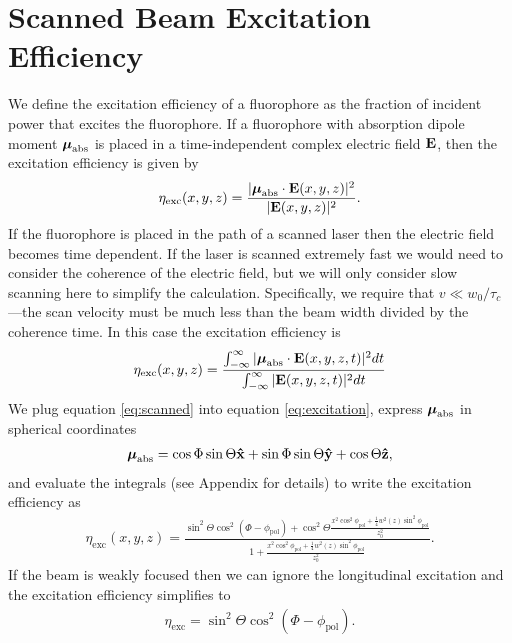 \documentclass[11pt]{article}
\begin{document}
\section{Scanned Beam Excitation Efficiency}
We define the excitation efficiency of a fluorophore as the fraction of 
incident power that excites the fluorophore. If a fluorophore with absorption
dipole moment $\boldsymbol{\mu}_{\text{abs}}$ is placed in a time-independent complex
electric field $\mathbf{E}$, then the excitation efficiency is given by
\begin{align}
  \eta_{\text{exc}}(x,y,z) = \frac{|\boldsymbol{\mu}_{\text{abs}} \cdot \mathbf{E}(x,y,z)|^2}{|\mathbf{E}(x,y,z) |^2}.
\end{align}
If the fluorophore is placed in the path of a scanned laser then the electric
field becomes time dependent. If the laser is scanned extremely fast we would
need to consider the coherence of the electric field, but we will only consider
slow scanning here to simplify the calculation. Specifically, we require that
$v \ll w_0/\tau_c$---the scan velocity must be much less than the beam width
divided by the coherence time. In this case the excitation efficiency is
\begin{align}
  \eta_{\text{exc}}(x,y,z) = \frac{\int_{-\infty}^{\infty}|\boldsymbol{\mu}_{\text{abs}} \cdot \mathbf{E}(x,y,z,t)|^2dt}{\int_{-\infty}^{\infty}|\mathbf{E}(x,y,z,t)|^2dt}\label{eq:excitation}
\end{align}
We plug equation \ref{eq:scanned} into equation \ref{eq:excitation}, express
$\boldsymbol{\mu}_{\text{abs}}$ in spherical coordinates
\begin{align}
  \boldsymbol{\mu}_{\text{abs}} = \cos\Phi\sin\Theta\mathbf{\hat{x}} + \sin\Phi\sin\Theta\mathbf{\hat{y}} + \cos\Theta\mathbf{\hat{z}},
\end{align}
and evaluate the integrals (see Appendix for details) to write the
excitation efficiency as
\begin{align}
  \eta_{\text{exc}}(x,y,z) = \frac{\sin^2\Theta\cos^2(\Phi-\phi_{\text{pol}}) + \cos^2\Theta\frac{x^2\cos^2\phi_{\text{pol}} + \frac{1}{4}w^2(z)\sin^2\phi_{\text{pol}}}{z_0^2}}{1+\frac{x^2\cos^2\phi_{\text{pol}} + \frac{1}{4}w^2(z)\sin^2\phi_{\text{pol}}}{z_0^2}}.\label{eq:strong}
\end{align}
If the beam is weakly focused then we can ignore the longitudinal excitation and
the excitation efficiency simplifies to
\begin{align}
  \eta_{\text{exc}} = \sin^2\Theta\cos^2(\Phi-\phi_{\text{pol}}).
\end{align}
\end{document}
